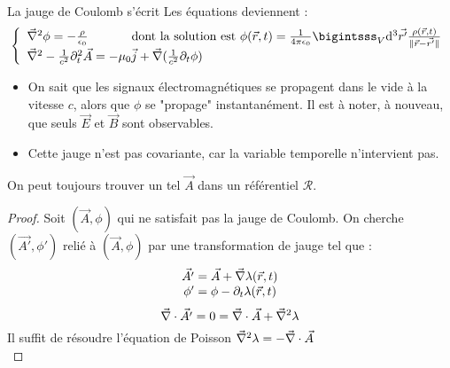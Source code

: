 	La jauge de Coulomb s'écrit 
	Les équations deviennent :
$$
	\left\{ \begin{array}{l}
		\nab^2\phi=-\frac{\rho}{\epsilon_0} \text{ \hspace{1cm} dont la solution est } \phi(\vec{r},t)=\frac{1}{4\pi\epsilon_0}\bigintsss_V\dif^3\vec{r'}\frac{\rho(\vec{r},t)}{\parallel\vec{r}-\vec{r'}\parallel}\\
		\nab^2-\frac{1}{c^2}\partial_t^2\vec{A}=-\mu_0\vec{j}+\nab(\frac{1}{c^2}\partial_t\phi)	
	\end{array} \right.
$$
	
	\begin{remarks}
		\hspace{1pt}
		\begin{itemize}
			\item On sait que les signaux électromagnétiques se propagent dans le vide à la vitesse $c$, alors que $\phi$ se "propage" instantanément. Il est à noter, à nouveau, que seuls $\vec{E}$ et $\vec{B}$ sont observables.
			\item Cette jauge n'est pas covariante, car la variable temporelle n'intervient pas.
		\end{itemize}
	\end{remarks}
	
	\begin{theorem}
		On peut toujours trouver un tel $\vec{A}$ dans un référentiel $\mathcal{R}$.
	\end{theorem}
	
	\begin{proof}
		Soit $(\vec{A},\phi)$ qui ne satisfait pas la jauge de Coulomb. On cherche $(\vec{A'},\phi')$ relié à $(\vec{A},\phi)$ par une transformation de jauge tel que :
$$
		\begin{array}{r@{\;}l}
				\vec{A'} &=\vec{A}+\nab\lambda(\vec{r},t)\\
			\phi'&=\phi-\partial_t\lambda(\vec{r},t)
		\end{array}
$$
$$
		\vec{\nabla}\cdot\vec{A'}=0=\vec{\nabla}\cdot\vec{A}+\vec{\nabla}^2\lambda
$$
	Il suffit de résoudre l'équation de Poisson $\vec{\nabla}^2\lambda=-\vec{\nabla}\cdot\vec{A}$ \\\qedhere
	\end{proof}
	
